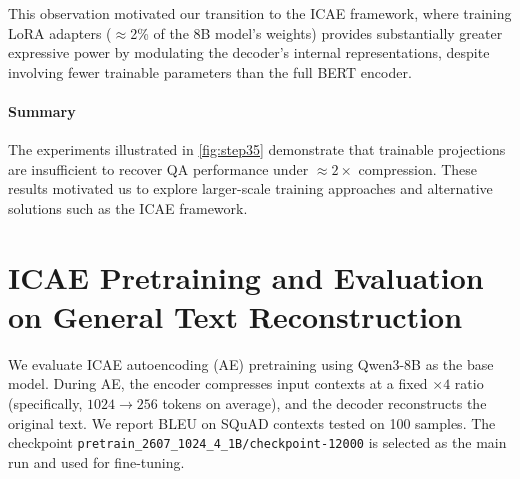 This observation motivated our transition to the ICAE framework, where training LoRA adapters ($\approx$2\% of the 8B model's weights) provides substantially greater expressive power by modulating the decoder's internal representations, despite involving fewer trainable parameters than the full BERT encoder.


\paragraph{Summary}
The experiments illustrated in \ref{fig:step35} demonstrate that trainable projections are insufficient to recover QA performance under $\approx2\times$ compression.
These results motivated us to explore larger-scale training approaches and alternative solutions such as the ICAE framework.



\section{ICAE Pretraining and Evaluation on General Text Reconstruction}

We evaluate ICAE autoencoding (AE) pretraining using Qwen3-8B as the base model.
During AE, the encoder compresses input contexts at a fixed $\times 4$ ratio (specifically, $1024\!\to\!256$ tokens on average), and the decoder reconstructs the original text.
We report BLEU on SQuAD contexts tested on 100 samples.
The checkpoint \texttt{pretrain\_2607\_1024\_4\_1B/checkpoint-12000} is selected as the main run and used for fine-tuning.

